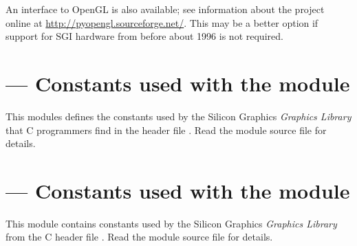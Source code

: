 \begin{seealso}
           {An interface to OpenGL is also available;
            see information about the
             project online at
            \url{http://pyopengl.sourceforge.net/}.  This may be a
            better option if support for SGI hardware from before
            about 1996 is not required.}
\end{seealso}


\section{ ---
         Constants used with the  module}


This modules defines the constants used by the Silicon Graphics
\emph{Graphics Library} that C programmers find in the header file
.
Read the module source file for details.


\section{ ---
         Constants used with the  module}


This module contains constants used by the Silicon Graphics
\emph{Graphics Library} from the C header file .
Read the module source file for details.
